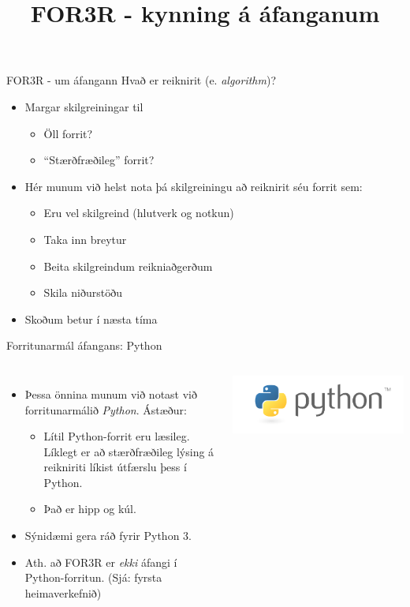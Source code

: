 \documentclass[handout]{beamer}
\title{FOR3R - kynning á áfanganum}
\begin{document}
\begin{frame}
\titlepage
\end{frame}

\begin{frame}{FOR3R - um áfangann}
Hvað er reiknirit (e. \emph{algorithm})?
\begin{itemize}[<+->]
 \item Margar skilgreiningar til
 \begin{itemize}
  \item Öll forrit?
  \item ``Stærðfræðileg'' forrit?
 \end{itemize}
 \item Hér munum við helst nota þá skilgreiningu að reiknirit séu forrit sem:
 \begin{itemize}[<+->]
  \item Eru vel skilgreind (hlutverk og notkun)
  \item Taka inn breytur
  \item Beita skilgreindum reikniaðgerðum
  \item Skila niðurstöðu
 \end{itemize}
 \item Skoðum betur í næsta tíma
\end{itemize}
\end{frame}

\begin{frame}{Forritunarmál áfangans: Python}
\begin{columns}[c]
\begin{itemize}[<+->]
 \item Þessa önnina munum við notast við forritunarmálið \emph{Python}. Ástæður:
 \begin{itemize}
  \item Lítil Python-forrit eru læsileg. Líklegt er að stærðfræðileg lýsing á reikniriti líkist útfærslu þess í Python.
  \item Það er hipp og kúl.
 \end{itemize}
 \item Sýnidæmi gera ráð fyrir Python 3.
 \item Ath. að FOR3R er \emph{ekki} áfangi í Python-forritun. (Sjá: fyrsta heimaverkefnið)
\end{itemize}
\includegraphics[width=\linewidth]{Pics/PythonLogo}
\end{columns}
\end{frame}
\end{document}
